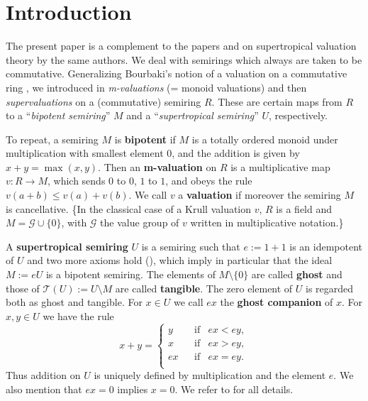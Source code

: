 \documentclass [12pt,a4paper,reqno]{amsart}
\begin{document}
\tableofcontents

\baselineskip 14pt


\section*{Introduction}

The present paper is a complement to  the papers \cite{IKR1} and
\cite{IKR2} on supertropical valuation theory by the same authors.
We deal with semirings which always are taken to be commutative.
Generalizing Bourbaki's notion of a valuation on a commutative
ring \cite{B}, we introduced in \cite{IKR1} \emph{{m}-valuations}
(= monoid valuations) and then \emph{supervaluations} on a
(commutative) semiring $R$. These are certain maps from $R$ to a
``\emph{bipotent semiring}'' $M$ and a ``\emph{supertropical
semiring}'' $U$, respectively.

To repeat, a semiring $M$ is \textbf{bipotent} if $M$ is a totally
ordered monoid  under multiplication with smallest element $0$,
and the addition is given by $x+ y = \max(x,y)$. Then an
\textbf{{m}-valuation} on $R$ is a multiplicative map $v: R \to M
$, which sends $0$  to $0$, $1$ to $1$, and obeys the rule $v(a+b)
\leq v(a) + v(b).$ We call $v$ a \textbf{valuation} if moreover
the semiring $M$ is cancellative. \{In the classical case of a
Krull valuation $v$, $R$ is a field and $M = {\mathcal G} \cup \{0\}$, with
${\mathcal G}$ the value group of $v$ written in multiplicative notation.\}

A \textbf{supertropical semiring} $U$ is a  semiring such that
$e:= 1+1$ is an idempotent of $U$ and two more axioms hold
(\cite[Definitions 3.5 and 3.9]{IKR1}), which imply in particular
that the ideal $M := eU$ is a bipotent semiring. The elements of
$M {\setminus} \{ 0 \}$ are called \textbf{ghost} and those of ${\mathcal T}(U) :=
U {\setminus} M$ are called \textbf{tangible}. The zero element of $U$ is
regarded both as ghost and tangible. For $x \in U$ we call $ex$
the \textbf{ghost companion} of $x$. For $x,y \in U$ we have the
rule
$$ x + y = \left\{
\begin{array}{llll}
  y  &  & \text{if} &  ex < ey, \\[1mm]
  x  &  & \text{if} &  ex > ey, \\[1mm]
  ex  &  & \text{if} &  ex = ey. \\
\end{array}
\right.$$ Thus  addition on $U$ is uniquely defined by
multiplication and the element $e$.  We also mention that $ex = 0
$ implies $x = 0$. We refer to \cite[\S3]{IKR1} for all details.
\end{document}
